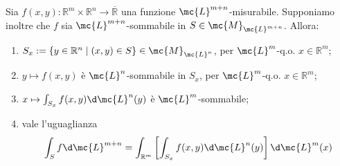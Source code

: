 \begin{corollary}[$\circ$]
    Sia $f(x, y): \mathbb{R}^{m} \times \mathbb{R}^{n} \rightarrow \overline{\mathbb{R}}$ una funzione $\mc{L}^{m+n}$-misurabile. Supponiamo inoltre che $f$ sia $\mc{L}^{m+n}$-sommabile in $S \in \mc{M}_{\mc{L}^{m+n}}$. Allora:
    \begin{enumerate}
        \item $S_{x}:=\left\{y \in \mathbb{R}^{n} \mid(x, y) \in S\right\} \in \mc{M}_{\mc{L}^{n}}$, per $\mc{L}^{m}$-q.o. $x \in \mathbb{R}^{m}$;
        
        \item $y \mapsto f(x, y)$ è $\mc{L}^{n}$-sommabile in $S_{x}$, per $\mc{L}^{m}$-q.o. $x \in \mathbb{R}^{m}$;
        
        \item $x \mapsto \int_{S_{x}} f(x, y) \d \mc{L}^{n}(y)$ è $\mc{L}^{m}$-sommabile;
        
        \item vale l'uguaglianza
        \[\int_{S} f \d \mc{L}^{m+n}=\int_{\mathbb{R}^{m}}\left[\int_{S_{x}} f(x, y) \d \mc{L}^{n}(y)\right] \d \mc{L}^{m}(x)\]
    \end{enumerate}
\end{corollary}

